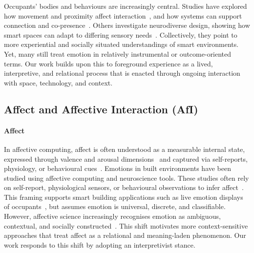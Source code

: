 Occupants’ bodies and behaviours are increasingly central. Studies have explored how movement and proximity affect interaction~\cite{homewood2021tracing, van2018skin}, and how systems can support connection and co-presence~\cite{wenhart2024there, hoare2015hide}. Others investigate neurodiverse design, showing how smart spaces can adapt to differing sensory needs~\cite{swaminathan2021tactile, garzotto2020interactive}. Collectively, they point to more experiential and socially situated understandings of smart environments. Yet, many still treat emotion in relatively instrumental or outcome-oriented terms. Our work builds upon this to foreground experience as a lived, interpretive, and relational process that is enacted through ongoing interaction with space, technology, and context.


\subsection{Affect and Affective Interaction (AfI)}
\label{sec:ch3-afi}
\paragraph{Affect}
In affective computing, affect is often understood as a measurable internal state, expressed through valence and arousal dimensions~\cite{russell1980circumplex} and captured via self-reports, physiology, or behavioural cues~\cite{picard1999affective}. Emotions in built environments have been studied using affective computing and neuroscience tools. These studies often rely on self-report, physiological sensors, or behavioural observations to infer affect~\cite{picard1999affective}. This framing supports smart building applications such as live emotion displays of occupants~\cite{behrens2018sentiment}, but assumes emotion is universal, discrete, and classifiable. However, affective science increasingly recognises emotion as ambiguous, contextual, and socially constructed~\cite{feldman2022affect, barrett2022context}. This shift motivates more context-sensitive approaches that treat affect as a relational and meaning-laden phenomenon. Our work responds to this shift by adopting an interpretivist stance.


